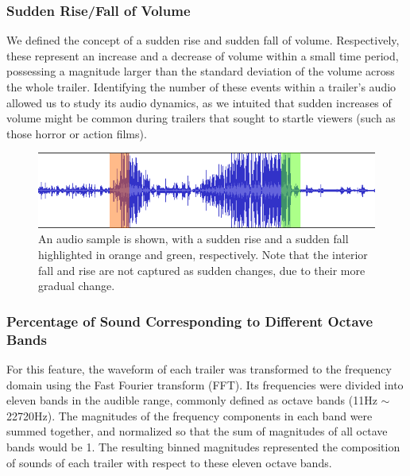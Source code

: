 \documentclass[letterpaper, 10 pt, conference]{ieeeconf}  %
\begin{document}
\subsubsection{Sudden Rise/Fall of Volume}
We defined the concept of a sudden rise and sudden fall of volume. Respectively, these represent an increase and a decrease of volume within a small time period, possessing a magnitude larger than the standard deviation of the volume across the whole trailer. Identifying the number of these events within a trailer's audio allowed us to study its audio dynamics, as we intuited that sudden increases of volume might be common during trailers that sought to startle viewers (such as those horror or action films).

\begin{figure}[h]
	\centering
	\includegraphics[width=\columnwidth]{audio_peaks.png}
	\caption{An audio sample is shown, with a sudden rise and a sudden fall highlighted in orange and green, respectively. Note that the interior fall and rise are not captured as sudden changes, due to their more gradual change.}
	\label{f:audio_peaks}
\end{figure}

\subsubsection{Percentage of Sound Corresponding to Different Octave Bands}
For this feature, the waveform of each trailer was transformed to the frequency domain using the Fast Fourier transform (FFT). Its frequencies were divided into eleven bands in the audible range, commonly defined as octave bands (11Hz $\sim$ 22720Hz). The magnitudes of the frequency components in each band were summed together, and normalized so that the sum of magnitudes of all octave bands would be 1. The resulting binned magnitudes represented the composition of sounds of each trailer with respect to these eleven octave bands. 
\end{document}
